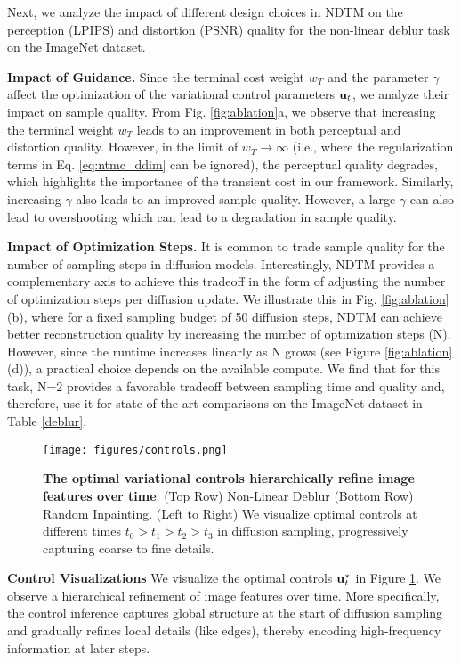 Next, we analyze the impact of different design choices in NDTM on the perception (LPIPS) and distortion (PSNR) quality for the non-linear deblur task on the ImageNet dataset.

\textbf{Impact of Guidance.} Since the terminal cost weight $w_T$ and the parameter $\gamma$ affect the optimization of the variational control parameters ${\mathbf{u}}_t$, we analyze their impact on sample quality. From Fig. \ref{fig:ablation}a, we observe that increasing the terminal weight $w_T$ leads to an improvement in both perceptual and distortion quality. However, in the limit of $w_T \rightarrow \infty$ (i.e., where the regularization terms in Eq. \ref{eq:ntmc_ddim} can be ignored), the perceptual quality degrades, which highlights the importance of the transient cost in our framework. Similarly, increasing $\gamma$ also leads to an improved sample quality. However, a large $\gamma$ can also lead to overshooting which can lead to a degradation in sample quality.

\textbf{Impact of Optimization Steps.} It is common to trade sample quality for the number of sampling steps in diffusion models. Interestingly, NDTM provides a complementary axis to achieve this tradeoff in the form of adjusting the number of optimization steps per diffusion update. We illustrate this in Fig. \ref{fig:ablation}(b), where for a fixed sampling budget of 50 diffusion steps, NDTM can achieve better reconstruction quality by increasing the number of optimization steps (N). However, since the runtime increases linearly as N grows (see Figure \ref{fig:ablation}(d)), a practical choice depends on the available compute. We find that for this task, N=2 provides a favorable tradeoff between sampling time and quality and, therefore, use it for state-of-the-art comparisons on the ImageNet dataset in Table \ref{deblur}.

\begin{figure}[th]
    \centering
    \texttt{[image: figures/controls.png]}
    \caption{\textbf{The optimal variational controls hierarchically refine image features over time}. (Top Row) Non-Linear Deblur (Bottom Row) Random Inpainting. (Left to Right) We visualize optimal controls at different times $t_0 > t_1 > t_2 > t_3$ in diffusion sampling, progressively capturing coarse to fine details.}
    \label{fig:control_viz}
\end{figure}

\textbf{Control Visualizations}
We visualize the optimal controls ${\mathbf{u}}_t^*$ in Figure \ref{fig:control_viz}. We observe a hierarchical refinement of image features over time. More specifically, the control inference captures global structure at the start of diffusion sampling and gradually refines local details (like edges), thereby encoding high-frequency information at later steps.
